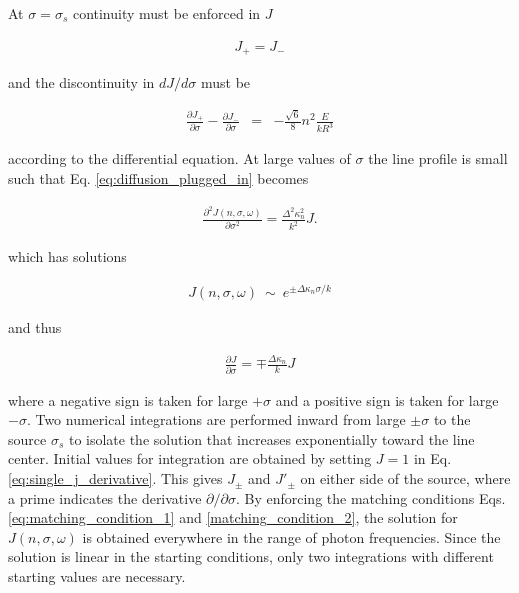 \documentclass{aastex63}
\newcommand{\be}{\begin{eqnarray}}
\newcommand{\ee}{\end{eqnarray}}
\begin{document}




At $\sigma=\sigma_s$ continuity must be enforced in $J$ 

\be \label{eq:matching_condition_1}
J_+ = J_-
\ee

and the discontinuity in $dJ/d\sigma$  must be

\be \label{matching_condition_2}
\frac{\partial J_+}{\partial \sigma} - \frac{\partial J_-}{\partial \sigma} & = & 
- \frac{\sqrt{6}}{8} n^2 \frac{E}{kR^3}
\ee

according to the differential equation. At large values of $\sigma$ the line profile is small such that Eq. \ref{eq:diffusion_plugged_in} becomes

\be \label{eq:diffusion_at_large_sigma}
\frac{\partial^2J(n, \sigma, \omega)}{\partial\sigma^2} = \frac{\Delta^2\kappa_n^2}{k^2} J.
\ee

which has solutions 

\be
J(n, \sigma, \omega)\ {\sim}\ e^{\pm \Delta \kappa_n \sigma / k}
\ee

and thus

\be \label{eq:single_j_derivative}
\frac{\partial J}{\partial \sigma} = \mp \frac{\Delta\kappa_n}{k} J
\ee


where a negative sign is taken for large $+\sigma$ and a positive sign is taken for large $-\sigma$. Two numerical integrations are performed inward from large $\pm \sigma$ to the source $\sigma_s$ to isolate the solution that increases exponentially toward the line center. Initial values for integration are obtained by setting $J=1$ in Eq. \ref{eq:single_j_derivative}. This gives $J_\pm$ and $J'_\pm$ on either side of the source, where a prime indicates the derivative $\partial/\partial \sigma$. By enforcing the matching conditions Eqs. \ref{eq:matching_condition_1} and \ref{matching_condition_2}, the solution for $J(n, \sigma, \omega)$ is obtained everywhere in the range of photon frequencies. Since the solution is linear in the starting conditions, only two integrations with different starting values are necessary.
\end{document}
